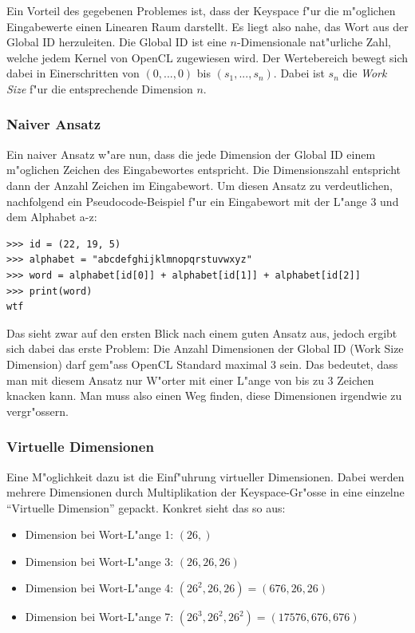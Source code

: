 \begin{refsection}
Ein Vorteil des gegebenen Problemes ist, dass der Keyspace f"ur die m"oglichen
Eingabewerte einen Linearen Raum darstellt. Es liegt also nahe, das Wort aus der
Global ID herzuleiten. Die Global ID ist eine $n$-Dimensionale nat"urliche Zahl,
welche jedem Kernel von OpenCL zugewiesen wird. Der Wertebereich bewegt sich
dabei in Einerschritten von $(0, ..., 0)$ bis $(s_1, ..., s_n)$. Dabei ist $s_n$
die \textit{Work Size} f"ur die entsprechende Dimension $n$.

\subsubsection{Naiver Ansatz}

Ein naiver Ansatz w"are nun, dass die jede Dimension der Global ID einem
m"oglichen Zeichen des Eingabewortes entspricht. Die Dimensionszahl entspricht
dann der Anzahl Zeichen im Eingabewort. Um diesen Ansatz zu verdeutlichen,
nachfolgend ein Pseudocode-Beispiel f"ur ein Eingabewort mit der L"ange 3 und
dem Alphabet a-z:

\begin{small}
\begin{verbatim}
>>> id = (22, 19, 5)
>>> alphabet = "abcdefghijklmnopqrstuvwxyz"
>>> word = alphabet[id[0]] + alphabet[id[1]] + alphabet[id[2]]
>>> print(word)
wtf
\end{verbatim}
\end{small}

\noindent Das sieht zwar auf den ersten Blick nach einem guten Ansatz aus,
jedoch ergibt sich dabei das erste Problem: Die Anzahl Dimensionen der Global ID
(Work Size Dimension) darf gem"ass OpenCL Standard\cite{crypto:opencl_ref}
maximal 3 sein. Das bedeutet, dass man mit diesem Ansatz nur W"orter mit einer
L"ange von bis zu 3 Zeichen knacken kann. Man muss also einen Weg finden, diese
Dimensionen irgendwie zu vergr"ossern.

\subsubsection{Virtuelle Dimensionen}

Eine M"oglichkeit dazu ist die Einf"uhrung virtueller Dimensionen. Dabei werden
mehrere Dimensionen durch Multiplikation der Keyspace-Gr"osse in eine einzelne
``Virtuelle Dimension'' gepackt. Konkret sieht das so aus:

\begin{itemize}
	\item Dimension bei Wort-L"ange 1: $(26,)$
	\item Dimension bei Wort-L"ange 3: $(26, 26, 26)$
	\item Dimension bei Wort-L"ange 4: $(26^2, 26, 26) = (676, 26, 26)$
	\item Dimension bei Wort-L"ange 7: $(26^3, 26^2, 26^2) = (17576, 676, 676)$
\end{itemize}


\end{refsection}
